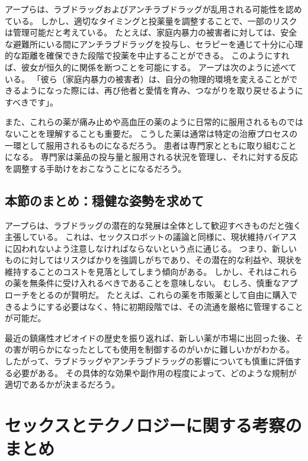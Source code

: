 \documentclass[paper=a4,book,openany]{jlreq}
\begin{document}
アープらは、ラブドラッグおよびアンチラブドラッグが乱用される可能性を認めている。
しかし、適切なタイミングと投薬量を調整することで、一部のリスクは管理可能だと考えている。
たとえば、家庭内暴力の被害者に対しては、安全な避難所にいる間にアンチラブドラッグを投与し、セラピーを通じて十分に心理的な距離を確保できた段階で投薬を中止することができる。
このようにすれば、彼女が恒久的に関係を断つことを可能にする。
アープは次のように述べている。
「彼ら（家庭内暴力の被害者）は、自分の物理的環境を変えることができるようになった際には、再び他者と愛情を育み、つながりを取り戻せるようにすべきです」\citep{szalavitz14:_is_it_possib_creat_anti_love_drug}。

また、これらの薬が痛み止めや高血圧の薬のように日常的に服用されるものではないことを理解することも重要だ。
こうした薬は通常は特定の治療プロセスの一環として服用されるものになるだろう。
患者は専門家とともに取り組むことになる。
専門家は薬品の投与量と服用される状況を管理し、それに対する反応を調整する手助けをおこなうことになるだろう。

\subsection{本節のまとめ：穏健な姿勢を求めて}

アープらは、ラブドラッグの潜在的な発展は全体として歓迎すべきものだと強く主張している。
これは、セックスロボットの議論と同様に、現状維持バイアスに囚われないよう注意しなければならないという点に通じる。
つまり、新しいものに対してはリスクばかりを強調しがちであり、その潜在的な利益や、現状を維持することのコストを見落としてしまう傾向がある。
しかし、それはこれらの薬を無条件に受け入れるべきであることを意味しない。
むしろ、慎重なアプローチをとるのが賢明だ。
たとえば、これらの薬を市販薬として自由に購入できるようにする必要はなく、特に初期段階では、その流通を厳格に管理することが可能だ。

最近の鎮痛性オピオイドの歴史を振り返れば、新しい薬が市場に出回った後、その害が明らかになったとしても使用を制御するのがいかに難しいかがわかる。
したがって、ラブドラッグやアンチラブドラッグの影響についても慎重に評価する必要がある。
その具体的な効果や副作用の程度によって、どのような規制が適切であるかが決まるだろう。

\section{セックスとテクノロジーに関する考察のまとめ}
\end{document}
